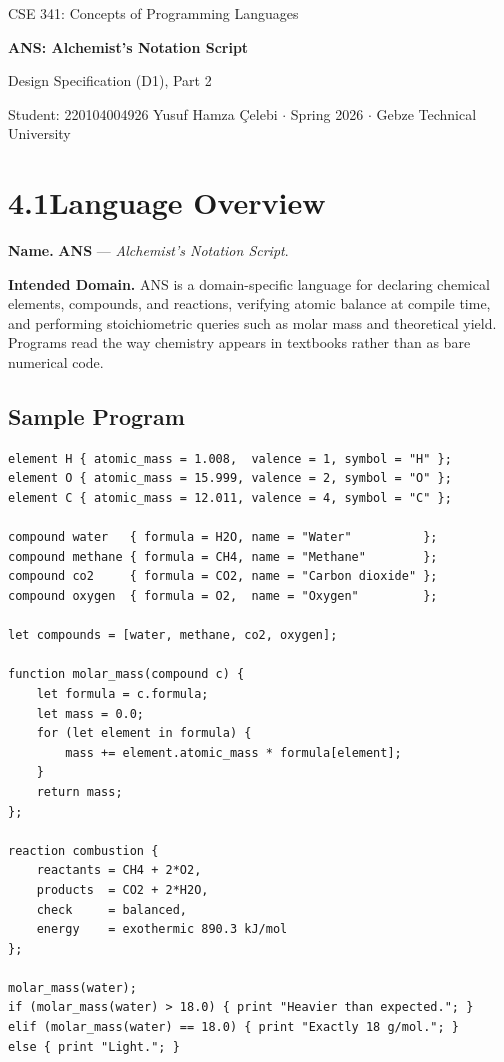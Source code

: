 \documentclass[11pt,a4paper]{article}
\begin{document}
\begin{center}
  {\footnotesize\color{anscaption}CSE 341: Concepts of Programming Languages\par}
  \vspace{3pt}
  {\huge\bfseries\sffamily ANS: Alchemist's Notation Script\par}
  \vspace{4pt}
  {\large Design Specification (D1), Part 2\par}
  \vspace{6pt}
  {\footnotesize\color{anscaption}
    Student: 220104004926 Yusuf Hamza \c{C}elebi \(\cdot\)
    Spring 2026 \(\cdot\)
    Gebze Technical University\par}
\end{center}
\vspace{7pt}

\section{4.1\quad Language Overview}

\textbf{Name.}\; \textbf{ANS} --- \textit{Alchemist's Notation Script}.

\textbf{Intended Domain.}\; ANS is a domain-specific language for declaring chemical elements, compounds, and reactions, verifying atomic balance at compile time, and performing stoichiometric queries such as molar mass and theoretical yield. Programs read the way chemistry appears in textbooks rather than as bare numerical code.

\subsection{Sample Program}
\begin{lstlisting}[style=ans]
element H { atomic_mass = 1.008,  valence = 1, symbol = "H" };
element O { atomic_mass = 15.999, valence = 2, symbol = "O" };
element C { atomic_mass = 12.011, valence = 4, symbol = "C" };

compound water   { formula = H2O, name = "Water"          };
compound methane { formula = CH4, name = "Methane"        };
compound co2     { formula = CO2, name = "Carbon dioxide" };
compound oxygen  { formula = O2,  name = "Oxygen"         };

let compounds = [water, methane, co2, oxygen];

function molar_mass(compound c) {
    let formula = c.formula;
    let mass = 0.0;
    for (let element in formula) {
        mass += element.atomic_mass * formula[element];
    }
    return mass;
};

reaction combustion {
    reactants = CH4 + 2*O2,
    products  = CO2 + 2*H2O,
    check     = balanced,
    energy    = exothermic 890.3 kJ/mol
};

molar_mass(water);
if (molar_mass(water) > 18.0) { print "Heavier than expected."; }
elif (molar_mass(water) == 18.0) { print "Exactly 18 g/mol."; }
else { print "Light."; }
\end{lstlisting}
\end{document}
